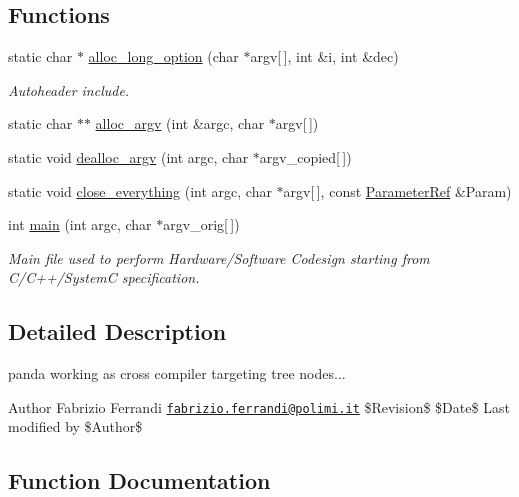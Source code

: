 \subsection*{Functions}
\begin{DoxyCompactItemize}
\item 
static char $\ast$ \hyperlink{tree-panda-gcc_8cpp_a21e223ecfa9ab60866ce6eebfcf51564}{alloc\+\_\+long\+\_\+option} (char $\ast$argv\mbox{[}$\,$\mbox{]}, int \&i, int \&dec)
\begin{DoxyCompactList}\small\item\em Autoheader include. \end{DoxyCompactList}\item 
static char $\ast$$\ast$ \hyperlink{tree-panda-gcc_8cpp_a36fa77da144f4db9e21e7f1111f36689}{alloc\+\_\+argv} (int \&argc, char $\ast$argv\mbox{[}$\,$\mbox{]})
\item 
static void \hyperlink{tree-panda-gcc_8cpp_acbcf6c3a420303b78ac2a91fd7a6484a}{dealloc\+\_\+argv} (int argc, char $\ast$argv\+\_\+copied\mbox{[}$\,$\mbox{]})
\item 
static void \hyperlink{tree-panda-gcc_8cpp_ae51885fe7e2d00d8ea88daa7c40f01e1}{close\+\_\+everything} (int argc, char $\ast$argv\mbox{[}$\,$\mbox{]}, const \hyperlink{Parameter_8hpp_a379beb25e5350c4c5585247ed50be3f9}{Parameter\+Ref} \&Param)
\item 
int \hyperlink{tree-panda-gcc_8cpp_a3f558354c40ef4683081b73e38fc7bc4}{main} (int argc, char $\ast$argv\+\_\+orig\mbox{[}$\,$\mbox{]})
\begin{DoxyCompactList}\small\item\em Main file used to perform Hardware/\+Software Codesign starting from C/\+C++/\+SystemC specification. \end{DoxyCompactList}\end{DoxyCompactItemize}


\subsection{Detailed Description}
panda working as cross compiler targeting tree nodes... 

\begin{DoxyAuthor}{Author}
Fabrizio Ferrandi \href{mailto:fabrizio.ferrandi@polimi.it}{\tt fabrizio.\+ferrandi@polimi.\+it} \$\+Revision\$ \$\+Date\$ Last modified by \$\+Author\$ 
\end{DoxyAuthor}


\subsection{Function Documentation}
\mbox{\label{tree-panda-gcc_8cpp_a36fa77da144f4db9e21e7f1111f36689}} 

